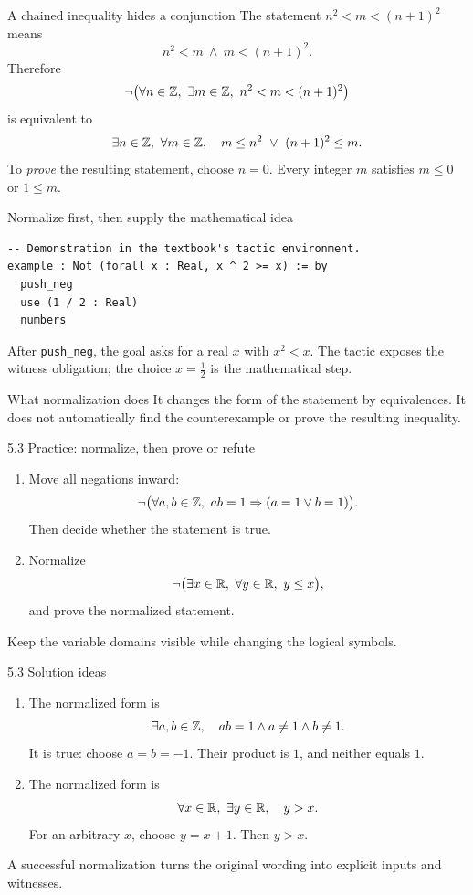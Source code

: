 \begin{frame}{A chained inequality hides a conjunction}
The statement $n^2<m<(n+1)^2$ means
\[
n^2<m\ \land\ m<(n+1)^2.
\]
Therefore
\[
\neg\bigl(\forall n\in\Z,\ \exists m\in\Z,\ n^2<m<(n+1)^2\bigr)
\]
is equivalent to
\[
\exists n\in\mathbb{Z},\ \forall m\in\mathbb{Z},\quad
m\le n^2\ \lor\ (n+1)^2\le m.
\]
To \emph{prove} the resulting statement, choose $n=0$. Every integer $m$ satisfies $m\le0$ or $1\le m$.
\end{frame}

\begin{frame}[fragile]{Normalize first, then supply the mathematical idea}
\begin{lstlisting}
-- Demonstration in the textbook's tactic environment.
example : Not (forall x : Real, x ^ 2 >= x) := by
  push_neg
  use (1 / 2 : Real)
  numbers
\end{lstlisting}
After \texttt{push\_neg}, the goal asks for a real $x$ with $x^2<x$.
The tactic exposes the witness obligation; the choice $x=\tfrac12$ is the mathematical step.
\begin{block}{What normalization does}
It changes the form of the statement by equivalences. It does not automatically find the counterexample or prove the resulting inequality.
\end{block}
\end{frame}

\begin{frame}{5.3 Practice: normalize, then prove or refute}
\begin{enumerate}
\item Move all negations inward:
\[
\neg\bigl(\forall a,b\in\Z,\ ab=1\Rightarrow(a=1\lor b=1)\bigr).
\]
Then decide whether the statement is true.
\item Normalize
\[
\neg\bigl(\exists x\in\R,\ \forall y\in\R,\ y\le x\bigr),
\]
and prove the normalized statement.
\end{enumerate}
Keep the variable domains visible while changing the logical symbols.
\end{frame}

\begin{frame}{5.3 Solution ideas}
\begin{enumerate}
\item The normalized form is
\[
\exists a,b\in\mathbb{Z},\quad ab=1\land a\ne1\land b\ne1.
\]
It is true: choose $a=b=-1$. Their product is $1$, and neither equals $1$.
\item The normalized form is
\[
\forall x\in\mathbb{R},\ \exists y\in\mathbb{R},\quad y>x.
\]
For an arbitrary $x$, choose $y=x+1$. Then $y>x$.
\end{enumerate}
A successful normalization turns the original wording into explicit inputs and witnesses.
\end{frame}


